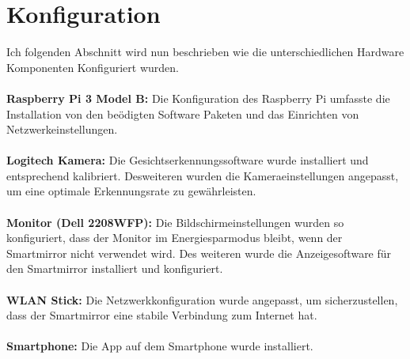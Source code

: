 \section{Konfiguration}
Ich folgenden Abschnitt wird nun beschrieben wie die unterschiedlichen Hardware Komponenten Konfiguriert wurden. \\ \\
\noindent
\textbf{Raspberry Pi 3 Model B:}
Die Konfiguration des Raspberry Pi umfasste die Installation von den beödigten Software Paketen und das Einrichten von Netzwerkeinstellungen. \\ \\
\noindent
\textbf{Logitech Kamera:}
Die Gesichtserkennungssoftware wurde installiert und entsprechend kalibriert. Desweiteren wurden die Kameraeinstellungen angepasst, um eine optimale Erkennungsrate zu gewährleisten. \\ \\
\noindent
\textbf{Monitor (Dell 2208WFP):}
Die Bildschirmeinstellungen wurden so konfiguriert, dass der Monitor im Energiesparmodus bleibt, wenn der Smartmirror nicht verwendet wird. Des weiteren wurde die Anzeigesoftware für den Smartmirror installiert und konfiguriert. \\ \\
\noindent
\textbf{WLAN Stick:}
Die Netzwerkkonfiguration wurde angepasst, um sicherzustellen, dass der Smartmirror eine stabile Verbindung zum Internet hat. \\ \\
\noindent
\textbf{Smartphone:}
Die App auf dem Smartphone wurde installiert. \\ \\
\noindent
